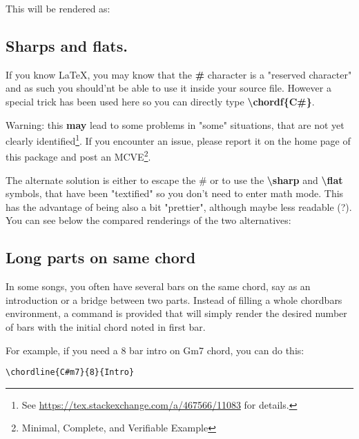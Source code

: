 \documentclass[11pt]{article}
\newcommand{\btt}{\bfseries \ttfamily }
\newcommand{\tbs}{\textbackslash{}}
\begin{document}


This will be rendered as:
\resetchordbars
\countbarsNo


\subsection{Sharps and flats.} If you know \LaTeX, you may know that the {\btt \#} character is a "reserved character" and as such you should'nt be able to use it inside your source file.
However a special trick has been used here so you can directly type {\btt \tbs chordf\{C\#\}}.

Warning: this {\bf may} lead to some problems in "some" situations, that are not yet clearly identified\footnote{See \url{https://tex.stackexchange.com/a/467566/11083} for details.}.
If you encounter an issue, please report it on the home page of this package and post an MCVE\footnote{Minimal, Complete, and Verifiable Example}.

The alternate solution is either to escape the \# or to use the {\btt \tbs sharp} and {\btt \tbs flat} symbols, that have been "textified" so you don't need to enter math mode.
This has the advantage of being also a bit "prettier", although maybe less readable (?).
You can see below the compared renderings of the two alternatives:

\vspace{1em}

\noindent
\begin{minipage}{0.54\textwidth}

\end{minipage}
%
\begin{minipage}{0.42\textwidth}

\end{minipage}

\subsection{Long parts on same chord}
In some songs, you often have several bars on the same chord, say as an introduction or a bridge between two parts.
Instead of filling a whole chordbars environment, a command is provided that will simply render the desired number of bars with the initial chord noted in first bar.

For example, if you need a 8 bar intro on Gm7 chord, you can do this:
\begin{lstlisting}
\chordline{C#m7}{8}{Intro}
\end{lstlisting}
\end{document}
